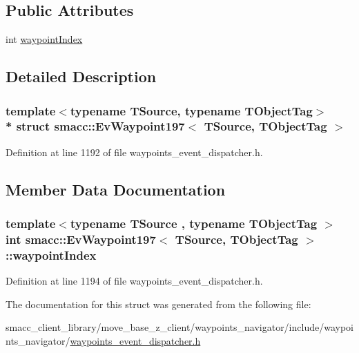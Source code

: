 \subsection*{Public Attributes}
\begin{DoxyCompactItemize}
\item 
int \hyperlink{structsmacc_1_1EvWaypoint197_ab81df524a6031f18d832243b33f596b3}{waypoint\+Index}
\end{DoxyCompactItemize}


\subsection{Detailed Description}
\subsubsection*{template$<$typename T\+Source, typename T\+Object\+Tag$>$\\*
struct smacc\+::\+Ev\+Waypoint197$<$ T\+Source, T\+Object\+Tag $>$}



Definition at line 1192 of file waypoints\+\_\+event\+\_\+dispatcher.\+h.



\subsection{Member Data Documentation}
\subsubsection[{\texorpdfstring{waypoint\+Index}{waypointIndex}}]{\setlength{\rightskip}{0pt plus 5cm}template$<$typename T\+Source , typename T\+Object\+Tag $>$ int {\bf smacc\+::\+Ev\+Waypoint197}$<$ T\+Source, T\+Object\+Tag $>$\+::waypoint\+Index}\hypertarget{structsmacc_1_1EvWaypoint197_ab81df524a6031f18d832243b33f596b3}{}\label{structsmacc_1_1EvWaypoint197_ab81df524a6031f18d832243b33f596b3}


Definition at line 1194 of file waypoints\+\_\+event\+\_\+dispatcher.\+h.



The documentation for this struct was generated from the following file\+:\begin{DoxyCompactItemize}
\item 
smacc\+\_\+client\+\_\+library/move\+\_\+base\+\_\+z\+\_\+client/waypoints\+\_\+navigator/include/waypoints\+\_\+navigator/\hyperlink{waypoints__event__dispatcher_8h}{waypoints\+\_\+event\+\_\+dispatcher.\+h}\end{DoxyCompactItemize}
